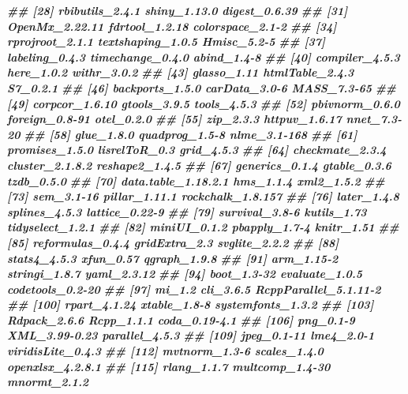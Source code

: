 \documentclass[
]{article}
\newenvironment{Shaded}{\begin{snugshade}}{\end{snugshade}}
\newcommand{\DocumentationTok}[1]{\textcolor[rgb]{0.56,0.35,0.01}{\textbf{\textit{#1}}}}
\begin{document}
\begin{Shaded}
\begin{Highlighting}[]
\DocumentationTok{\#\#  [28] rbibutils\_2.4.1       shiny\_1.13.0          digest\_0.6.39        }
\DocumentationTok{\#\#  [31] OpenMx\_2.22.11        fdrtool\_1.2.18        colorspace\_2.1{-}2     }
\DocumentationTok{\#\#  [34] rprojroot\_2.1.1       textshaping\_1.0.5     Hmisc\_5.2{-}5          }
\DocumentationTok{\#\#  [37] labeling\_0.4.3        timechange\_0.4.0      abind\_1.4{-}8          }
\DocumentationTok{\#\#  [40] compiler\_4.5.3        here\_1.0.2            withr\_3.0.2          }
\DocumentationTok{\#\#  [43] glasso\_1.11           htmlTable\_2.4.3       S7\_0.2.1             }
\DocumentationTok{\#\#  [46] backports\_1.5.0       carData\_3.0{-}6         MASS\_7.3{-}65          }
\DocumentationTok{\#\#  [49] corpcor\_1.6.10        gtools\_3.9.5          tools\_4.5.3          }
\DocumentationTok{\#\#  [52] pbivnorm\_0.6.0        foreign\_0.8{-}91        otel\_0.2.0           }
\DocumentationTok{\#\#  [55] zip\_2.3.3             httpuv\_1.6.17         nnet\_7.3{-}20          }
\DocumentationTok{\#\#  [58] glue\_1.8.0            quadprog\_1.5{-}8        nlme\_3.1{-}168         }
\DocumentationTok{\#\#  [61] promises\_1.5.0        lisrelToR\_0.3         grid\_4.5.3           }
\DocumentationTok{\#\#  [64] checkmate\_2.3.4       cluster\_2.1.8.2       reshape2\_1.4.5       }
\DocumentationTok{\#\#  [67] generics\_0.1.4        gtable\_0.3.6          tzdb\_0.5.0           }
\DocumentationTok{\#\#  [70] data.table\_1.18.2.1   hms\_1.1.4             xml2\_1.5.2           }
\DocumentationTok{\#\#  [73] sem\_3.1{-}16            pillar\_1.11.1         rockchalk\_1.8.157    }
\DocumentationTok{\#\#  [76] later\_1.4.8           splines\_4.5.3         lattice\_0.22{-}9       }
\DocumentationTok{\#\#  [79] survival\_3.8{-}6        kutils\_1.73           tidyselect\_1.2.1     }
\DocumentationTok{\#\#  [82] miniUI\_0.1.2          pbapply\_1.7{-}4         knitr\_1.51           }
\DocumentationTok{\#\#  [85] reformulas\_0.4.4      gridExtra\_2.3         svglite\_2.2.2        }
\DocumentationTok{\#\#  [88] stats4\_4.5.3          xfun\_0.57             qgraph\_1.9.8         }
\DocumentationTok{\#\#  [91] arm\_1.15{-}2            stringi\_1.8.7         yaml\_2.3.12          }
\DocumentationTok{\#\#  [94] boot\_1.3{-}32           evaluate\_1.0.5        codetools\_0.2{-}20     }
\DocumentationTok{\#\#  [97] mi\_1.2                cli\_3.6.5             RcppParallel\_5.1.11{-}2}
\DocumentationTok{\#\# [100] rpart\_4.1.24          xtable\_1.8{-}8          systemfonts\_1.3.2    }
\DocumentationTok{\#\# [103] Rdpack\_2.6.6          Rcpp\_1.1.1            coda\_0.19{-}4.1        }
\DocumentationTok{\#\# [106] png\_0.1{-}9             XML\_3.99{-}0.23         parallel\_4.5.3       }
\DocumentationTok{\#\# [109] jpeg\_0.1{-}11           lme4\_2.0{-}1            viridisLite\_0.4.3    }
\DocumentationTok{\#\# [112] mvtnorm\_1.3{-}6         scales\_1.4.0          openxlsx\_4.2.8.1     }
\DocumentationTok{\#\# [115] rlang\_1.1.7           multcomp\_1.4{-}30       mnormt\_2.1.2}
\end{Highlighting}
\end{Shaded}
\end{document}
